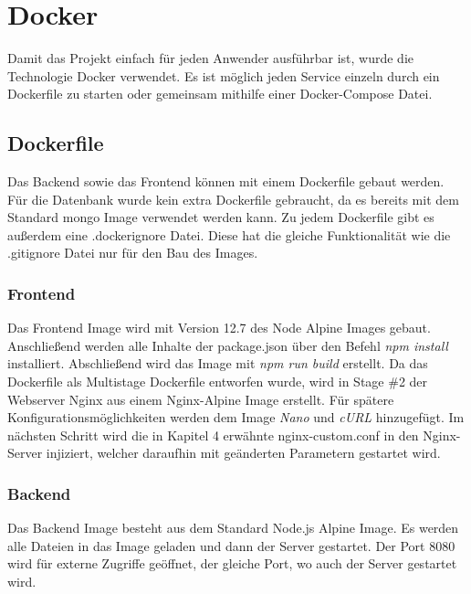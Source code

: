 \chapter{Docker}\label{ch:hosting}
Damit das Projekt einfach für jeden Anwender ausführbar ist, wurde die Technologie Docker verwendet. Es ist möglich jeden Service einzeln durch ein Dockerfile zu starten oder gemeinsam mithilfe einer Docker-Compose Datei.

\section{Dockerfile}
Das Backend sowie das Frontend können mit einem Dockerfile gebaut werden. Für die Datenbank wurde kein extra Dockerfile gebraucht, da es bereits mit dem Standard mongo Image verwendet werden kann. Zu jedem Dockerfile gibt es außerdem eine .dockerignore Datei. Diese hat die gleiche Funktionalität wie die .gitignore Datei nur für den Bau des Images.

\subsection{Frontend}
Das Frontend Image wird mit Version 12.7 des Node Alpine Images gebaut. Anschließend werden alle Inhalte der package.json über den Befehl \emph{npm install} installiert. Abschließend wird das Image mit \emph{npm run build} erstellt. Da das Dockerfile als Multistage Dockerfile entworfen wurde, wird in Stage \#{}2 der Webserver Nginx aus einem Nginx-Alpine Image erstellt. Für spätere Konfigurationsmöglichkeiten werden dem Image \emph{Nano} und \emph{cURL} hinzugefügt. Im nächsten Schritt wird die in Kapitel 4 erwähnte nginx-custom.conf in den Nginx-Server injiziert, welcher daraufhin mit geänderten Parametern gestartet wird.

\subsection{Backend}
Das Backend Image besteht aus dem Standard Node.js Alpine Image. Es werden alle Dateien in das Image geladen und dann der Server gestartet. Der Port 8080 wird für externe Zugriffe geöffnet, der gleiche Port, wo auch der Server gestartet wird.

